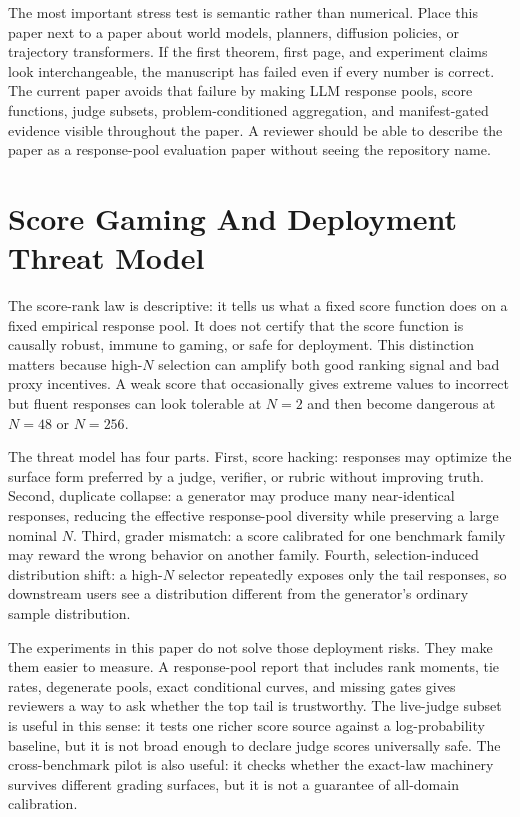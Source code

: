 The most important stress test is semantic rather than numerical. Place this
paper next to a paper about world models, planners, diffusion policies, or
trajectory transformers. If the first theorem, first page, and experiment
claims look interchangeable, the manuscript has failed even if every number is
correct. The current paper avoids that failure by making LLM response pools,
score functions, judge subsets, problem-conditioned aggregation, and
manifest-gated evidence visible throughout the paper. A reviewer should be
able to describe the paper as a response-pool evaluation paper without seeing
the repository name.

\section{Score Gaming And Deployment Threat Model}
\label{app:score-gaming}

The score-rank law is descriptive: it tells us what a fixed score function does
on a fixed empirical response pool. It does not certify that the score function
is causally robust, immune to gaming, or safe for deployment. This distinction
matters because high-$N$ selection can amplify both good ranking signal and bad
proxy incentives. A weak score that occasionally gives extreme values to
incorrect but fluent responses can look tolerable at $N=2$ and then become
dangerous at $N=48$ or $N=256$.

The threat model has four parts. First, score hacking: responses may optimize
the surface form preferred by a judge, verifier, or rubric without improving
truth. Second, duplicate collapse: a generator may produce many near-identical
responses, reducing the effective response-pool diversity while preserving a
large nominal $N$. Third, grader mismatch: a score calibrated for one
benchmark family may reward the wrong behavior on another family. Fourth,
selection-induced distribution shift: a high-$N$ selector repeatedly exposes
only the tail responses, so downstream users see a distribution different
from the generator's ordinary sample distribution.

The experiments in this paper do not solve those deployment risks. They make
them easier to measure. A response-pool report that includes rank moments,
tie rates, degenerate pools, exact conditional curves, and missing gates gives
reviewers a way to ask whether the top tail is trustworthy. The live-judge
subset is useful in this sense: it tests one richer score source against a
log-probability baseline, but it is not broad enough to declare judge scores
universally safe. The cross-benchmark pilot is also useful: it checks whether
the exact-law machinery survives different grading surfaces, but it is not a
guarantee of all-domain calibration.

